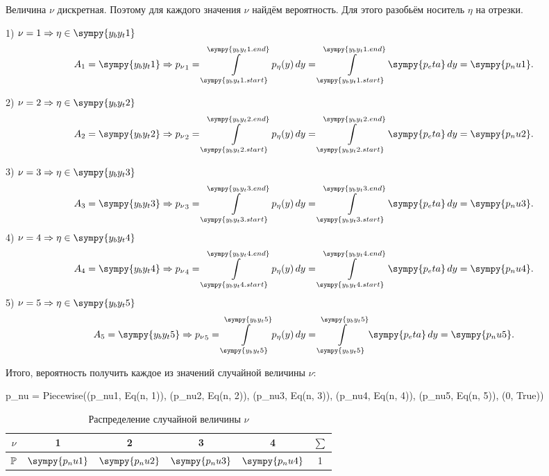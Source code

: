 Величина $\nu$ дискретная. Поэтому для каждого значения $\nu$ найдём вероятность. Для этого разобьём носитель $\eta$ на отрезки.

1) $\nu = 1 \Rightarrow \eta \in \sympy{y_by_t1}$
\[
    A_1 = \sympy{y_by_t1} \Rightarrow
    {p_\nu}_1
    = \int\limits_{\sympy{y_by_t1.start}}^{\sympy{y_by_t1.end}} p_{\eta} (y) \, dy
    = \int\limits_{\sympy{y_by_t1.start}}^{\sympy{y_by_t1.end}} \sympy{p_eta} \, dy
    = \sympy{p_nu1}.
\]

2) $\nu = 2 \Rightarrow \eta \in \sympy{y_by_t2}$
\[
    A_2 = \sympy{y_by_t2} \Rightarrow
    {p_\nu}_2
    = \int\limits_{\sympy{y_by_t2.start}}^{\sympy{y_by_t2.end}} p_{\eta} (y) \, dy
    = \int\limits_{\sympy{y_by_t2.start}}^{\sympy{y_by_t2.end}} \sympy{p_eta} \, dy
    = \sympy{p_nu2}.
\]

3) $\nu = 3 \Rightarrow \eta \in \sympy{y_by_t3}$
\[
    A_3 = \sympy{y_by_t3} \Rightarrow
    {p_\nu}_3
    = \int\limits_{\sympy{y_by_t3.start}}^{\sympy{y_by_t3.end}} p_{\eta} (y) \, dy
    = \int\limits_{\sympy{y_by_t3.start}}^{\sympy{y_by_t3.end}} \sympy{p_eta} \, dy
    = \sympy{p_nu3}.
\]
4) $\nu = 4 \Rightarrow \eta \in \sympy{y_by_t4}$
\[
    A_4 = \sympy{y_by_t4} \Rightarrow
    {p_\nu}_4
    = \int\limits_{\sympy{y_by_t4.start}}^{\sympy{y_by_t4.end}} p_{\eta} (y) \, dy
    = \int\limits_{\sympy{y_by_t4.start}}^{\sympy{y_by_t4.end}} \sympy{p_eta} \, dy
    = \sympy{p_nu4}.
\]
5) $\nu = 5 \Rightarrow \eta \in \sympy{y_by_t5}$
\[
    A_5 = \sympy{y_by_t5} \Rightarrow
    {p_\nu}_5
    = \int\limits_{\sympy{y_by_t5}}^{\sympy{y_by_t5}} p_{\eta} (y) \, dy
    = \int\limits_{\sympy{y_by_t5}}^{\sympy{y_by_t5}} \sympy{p_eta} \, dy
    = \sympy{p_nu5}.
\]

Итого, вероятность получить каждое из значений случайной величины $\nu$:
\begin{sympycode}
p_nu = Piecewise((p_nu1, Eq(n, 1)), (p_nu2, Eq(n, 2)), (p_nu3, Eq(n, 3)), (p_nu4, Eq(n, 4)), (p_nu5, Eq(n, 5)), (0, True))
\end{sympycode}
\begin{table}[h!]
    \centering
    \caption{Распределение случайной величины $\nu$}
    \begin{tabular}{|c|c|c|c|c|c|}
        \hline
        $\nu$   & 1               & 2               & 3               & 4               & $\sum$ \\
        \hline
        $\mathbb P$ & $\sympy{p_nu1}$ & $\sympy{p_nu2}$ & $\sympy{p_nu3}$ & $\sympy{p_nu4}$ & 1      \\
        \hline
    \end{tabular}
\end{table}


